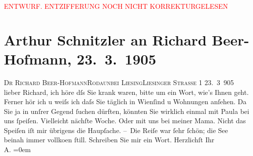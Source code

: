 
\begin{center}
            \textcolor{red}{ENTWURF. ENTZIFFERUNG NOCH NICHT KORREKTURGELESEN}
                      \end{center}
            
               \section[Arthur Schnitzler an Richard Beer-Hofmann, 23. 3. 1905]{ Arthur Schnitzler an Richard Beer-Hofmann,
               23. 3. 1905}\nopagebreak{}\rehead{ }\begin{ledgroupsized}[t]{13cm}\normalsize\beginnumbering{} \toendnotes[C]{\smallbreak\pagebreak[2]} 
\toendnotes[C]{\smallbreak}\pstart{}{\pb}\textsc{Dr Richard Beer-Hofmann}\pend{}\pstart{}\textsc{Rodaun}\pend{}\pstart{}\textsc{bei Liesing}\pend{}\pstart{}\textsc{Liesinger Straße} 1\pend{}{\bigskip}\pstart
           \raggedleft{}{\pb}23. 3 905\pend
           \pstart
           lieber Richard, ich höre dſs Sie krank waren, bitte um ein Wort,
               wie’s Ihnen geht. Ferner hör ich u weiſs ich daſs Sie täglich in Wienſind u Wohnungen anſehen. Da Sie ja in unſrer
               Gegend ſuchen dürften, könnten Sie wirk{\pb}lich einmal
               mit Paula bei uns ſpeiſen. Vielleicht nächſte
               Woche. Oder mit uns bei meiner Mama. Nicht das Speiſen iſt mir übrigens die Haupſache.\pend
           \pstart
           – Die Reiſe war ſehr ſchön; die See beinah immer vollko{\geminationm}en ſtill.\pend
           \pstart
           {\pb}Schreiben Sie mir ein Wort.\pend
           \pstart
           Herzlichſt Ihr{\\[\baselineskip]}\spacefill\mbox{A.}\pend
           \leftskip=0em{}\endnumbering{}\end{ledgroupsized}  \newcommand{\dateiname}{L01510}\newcommand{\titel}{Arthur Schnitzler an Richard Beer-Hofmann, 23. 3. 1905}\newcommand{\editorInnen}{Martin Anton Müller und Gerd-Hermann Susen}
      